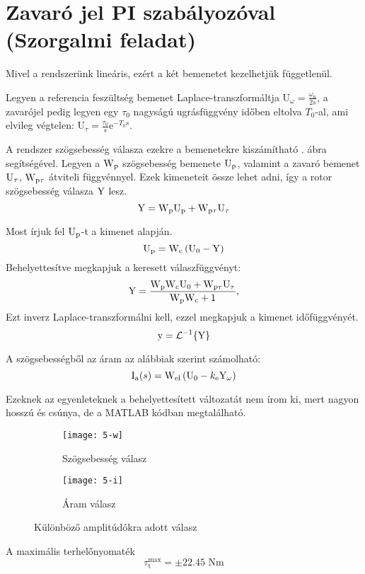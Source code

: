 \section{Zavaró jel PI szabályozóval (Szorgalmi feladat)}\label{sec:szorg-pi}

Mivel a rendszerünk lineáris, ezért a két bemenetet kezelhetjük függetlenül.

Legyen a referencia feszültség bemenet Laplace-transzformáltja
$\mathrm{U}_\omega = \frac{\omega_\text{n}}{2s}$,
a zavarójel pedig legyen egy $\tau_0$ nagyságú ugrásfüggvény időben eltolva $T_0$-al,
ami elvileg végtelen: $\mathrm{U}_\tau=\frac{\tau_0}{s}\text{e}^{-T_0s}$.

A rendszer szögsebesség válasza ezekre a bemenetekre kiszámítható .
ábra segítségével.
Legyen a $\mathrm{W}_\text{p}$ szögsebesség bemenete $\mathrm{U}_\text{p}$, valamint a 
zavaró bemenet $\mathrm{U}_\tau$, $\mathrm{W}_{\text{p}\tau}$ átviteli függvénnyel.
Ezek kimeneteit össze lehet adni, így a rotor szögsebesség válasza $\mathrm{Y}$ lesz.
\begin{equation}
	\mathrm{Y} = \mathrm{W}_\text{p}\mathrm{U}_\text{p} + \mathrm{W}_{\text{p}\tau}\mathrm{U}_\tau
\end{equation}

Most írjuk fel $\mathrm{U}_\text{p}$-t a kimenet alapján.
\begin{equation}
	\mathrm{U}_\text{p} = \mathrm{W}_\text{c}\left(\mathrm{U}_0 - \mathrm{Y}\right)
\end{equation}
%
Behelyettesítve megkapjuk a keresett válaszfüggvényt:
\begin{equation}
	\mathrm{Y} = \frac{\mathrm{W}_\text{p}\mathrm{W}_\text{c}\mathrm{U}_0 + \mathrm{W}_{\text{p}\tau}\mathrm{U}_\tau}{\mathrm{W}_\text{p}\mathrm{W}_\text{c} +1},
\end{equation}
%
Ezt inverz Laplace-transzformálni kell, ezzel megkapjuk a kimenet időfüggvényét.
\begin{equation}
	\mathrm{y} = \mathcal{L}^{-1}\{\mathrm{Y}\}
\end{equation}

A szögsebességből az áram az alábbiak szerint számolható:
\begin{equation}
	\mathrm{I}_\text{a}(s) = \mathrm{W}_\text{el}\left(\mathrm{U}_0 - k_\text{e}\mathrm{Y}_\omega\right)
\end{equation}

Ezeknek az egyenleteknek a behelyettesített változatát nem írom ki, mert
nagyon hosszú és csúnya, de a MATLAB kódban megtalálható.

\begin{figure}[H]
	\centering
	\begin{subfigure}{.49\textwidth}
		\texttt{[image: 5-w]}
		\caption{Szögsebesség válasz}
	\end{subfigure}
	\begin{subfigure}{.49\textwidth}
		\texttt{[image: 5-i]}
		\caption{Áram válasz}
	\end{subfigure}
	\caption{Különböző amplitúdókra adott válasz}
	\label{fig:szorg1}
\end{figure}

A maximális terhelőnyomaték
\begin{equation}
	\tau_\text{t}^\text{max} = \pm22.45\text{ Nm}
\end{equation}

